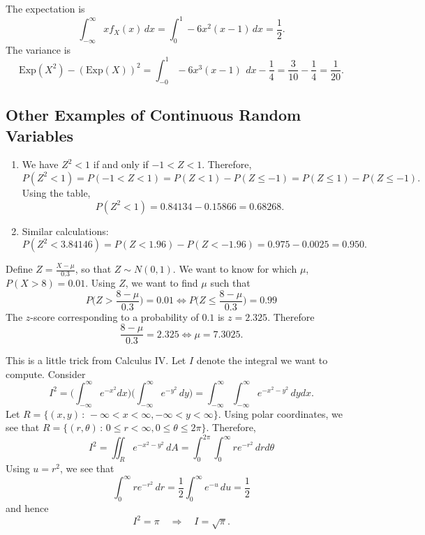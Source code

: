 \begin{problem}
The expectation is
    \[
        \int_{-\infty}^\infty x f_X (x) \, dx = \int_0^1 -6 x^2 (x - 1) \, dx = \frac{1}{2} . 
    \]
The variance is
    \[
        \mathrm{Exp} (X^2) - (\mathrm{Exp} (X))^2 = \int_{-0}^1 -6 x^3 (x -1) \, \ dx - \frac{1}{4} = \frac{3}{10} - \frac{1}{4} = \frac{1}{20} .\tag*{$\square$}
    \]
\end{problem}

\subsection{Other Examples of Continuous Random Variables}

\begin{problem}
    \begin{enumerate}[label=\alph*)]
        \item We have $Z^2 < 1$ if and only if $-1 < Z < 1$. Therefore, 
            \[
                P (Z^2 < 1) = P (-1 < Z < 1 ) = P (Z < 1) - P (Z \leq -1) = P (Z \leq 1 ) - P (Z \leq -1).
            \]
        Using the table, 
            \[
                P (Z^2 < 1) = 0.84134 - 0.15866 = 0.68268 .
            \]
        \item Similar calculations:
            \[
                P (Z^2 < 3.84146) = P (Z < 1.96) - P (Z < -1.96) = 0.975 - 0.0025 = 0.950 . \tag*{$\square$}
            \]
    \end{enumerate}
\end{problem}

\begin{problem}
Define $Z = \frac{X - \mu}{0.3}$, so that $Z \sim N (0, 1)$. We want to know for which $\mu$, $P (X > 8) = 0.01$. Using $Z$, we want to find $\mu$ such that
    \[
        P \Big( Z > \frac{8 - \mu}{0.3} \Big) = 0.01  \iff P \Big( Z \leq \frac{8 - \mu}{0.3} \Big) = 0.99
    \]
The $z$-score corresponding to a probability of $0.1$ is $z = 2.325$. Therefore
    \[
        \frac{8 - \mu}{0.3} = 2.325 \iff \mu = 7.3025 . \tag*{$\square$}
    \]
\end{problem}

\begin{problem}
This is a little trick from Calculus IV. Let $I$ denote the integral we want to compute. Consider 
    \[
        I^2 = \Big( \int_{-\infty}^\infty e^{-x^2} dx \Big) \Big( \int_{-\infty}^\infty e^{-y^2} \, dy \Big) = \int_{-\infty}^\infty \int_{-\infty}^\infty e^{-x^2 - y^2} \, dy dx .
    \]
Let $R = \{ (x, y) \, : \, -\infty < x < \infty , -\infty < y < \infty \}$. Using polar coordinates, we see that $R = \{ (r, \theta ) \, : \, 0 \leq r < \infty , 0 \leq \theta \leq 2\pi \}$. Therefore,
    \[
        I^2 = \iint_R e^{-x^2 - y^2} \, dA = \int_0^{2\pi} \int_0^\infty r e^{-r^2} \, dr d\theta 
    \]
Using $u = r^2$, we see that
    \[
        \int_0^\infty re^{-r^2} \, dr = \frac{1}{2} \int_0^\infty e^{-u} \, du = \frac{1}{2} 
    \]
and hence
    \[
        I^2 = \pi \quad \Longrightarrow \quad I = \sqrt{\pi} . \tag*{$\square$}
    \]
\end{problem}

